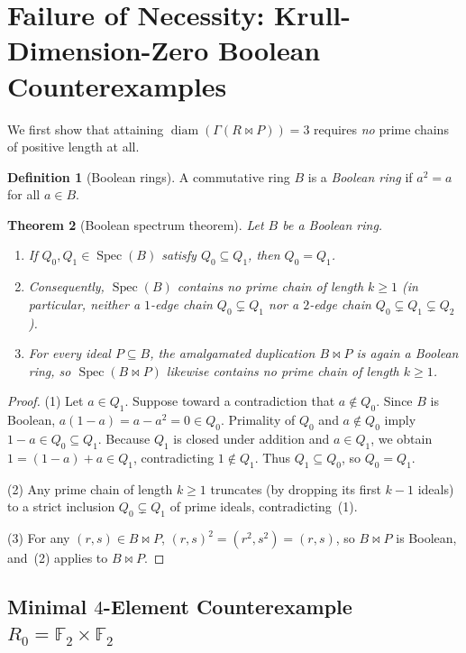 \documentclass[11pt]{article}
\newtheorem{theorem}{Theorem}[section]
\theoremstyle{definition}
\newtheorem{definition}[theorem]{Definition}
\newcommand{\Spec}{\operatorname{Spec}}
\newcommand{\diam}{\operatorname{diam}}
\newcommand{\FF}{\mathbb{F}}
\begin{document}
\section{Failure of Necessity: Krull-Dimension-Zero Boolean Counterexamples}

We first show that attaining $\diam(\Gamma(R \bowtie P)) = 3$ requires \emph{no} prime
chains of positive length at all.

\begin{definition}[Boolean rings]\label{def:boolean}
A commutative ring $B$ is a \emph{Boolean ring} if $a^2 = a$ for all $a \in B$.
\end{definition}

\begin{theorem}[Boolean spectrum theorem]\label{thm:boolean-spec}
Let $B$ be a Boolean ring.
\begin{enumerate}
  \item If $Q_0, Q_1 \in \Spec(B)$ satisfy $Q_0 \subseteq Q_1$, then $Q_0 = Q_1$.
  \item Consequently, $\Spec(B)$ contains \emph{no} prime chain of length $k \ge 1$
  (in particular, neither a $1$-edge chain $Q_0 \subsetneq Q_1$ nor a $2$-edge chain
  $Q_0 \subsetneq Q_1 \subsetneq Q_2$).
  \item For every ideal $P \subseteq B$, the amalgamated duplication $B \bowtie P$ is
  again a Boolean ring, so $\Spec(B \bowtie P)$ likewise contains no prime chain of
  length $k \ge 1$.
\end{enumerate}
\end{theorem}
\begin{proof}
(1) Let $a \in Q_1$. Suppose toward a contradiction that $a \notin Q_0$. Since $B$ is
Boolean, $a(1 - a) = a - a^2 = 0 \in Q_0$. Primality of $Q_0$ and $a \notin Q_0$ imply
$1 - a \in Q_0 \subseteq Q_1$. Because $Q_1$ is closed under addition and $a \in Q_1$,
we obtain $1 = (1 - a) + a \in Q_1$, contradicting $1 \notin Q_1$. Thus $Q_1 \subseteq Q_0$,
so $Q_0 = Q_1$.

(2) Any prime chain of length $k \ge 1$ truncates (by dropping its first $k - 1$ ideals)
to a strict inclusion $Q_0 \subsetneq Q_1$ of prime ideals, contradicting~(1).

(3) For any $(r, s) \in B \bowtie P$, $(r, s)^2 = (r^2, s^2) = (r, s)$, so $B \bowtie P$
is Boolean, and~(2) applies to $B \bowtie P$.
\end{proof}

\subsection{Minimal \texorpdfstring{$4$}{4}-Element Counterexample \texorpdfstring{$R_0 = \FF_2 \times \FF_2$}{R0 = F2 x F2}}
\end{document}
